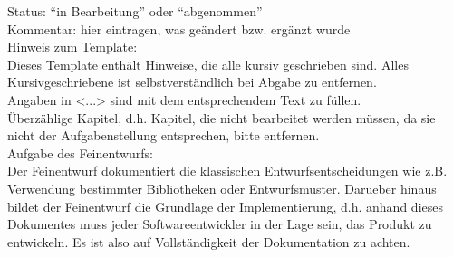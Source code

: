 Status: "`in Bearbeitung"' oder "`abgenommen"'\\
Kommentar: hier eintragen, was ge\"andert bzw. erg\"anzt wurde\\

Hinweis zum Template:\\
Dieses Template enth\"alt Hinweise, die alle kursiv geschrieben sind. Alles
Kursivgeschriebene ist selbstverst\"andlich bei Abgabe zu entfernen.\\
Angaben in <...> sind mit dem entsprechendem Text zu f\"ullen.\\
\"Uberz\"ahlige Kapitel, d.h. Kapitel, die nicht bearbeitet werden m\"ussen, da
sie nicht der Aufgabenstellung entsprechen, bitte entfernen.\\

Aufgabe des Feinentwurfs:\\
Der Feinentwurf dokumentiert die klassischen Entwurfsentscheidungen wie z.B.
Verwendung bestimmter Bibliotheken oder Entwurfsmuster. Darueber hinaus
bildet der Feinentwurf die Grundlage der Implementierung, d.h. anhand
dieses Dokumentes muss jeder Softwareentwickler in der Lage sein, das Produkt
zu entwickeln. Es ist also auf Vollst\"andigkeit der Dokumentation zu
achten.
